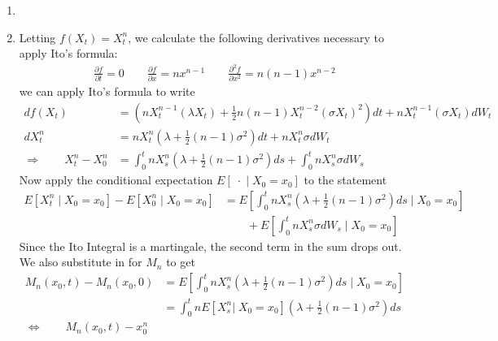 \documentclass[12pt]{article}
\theoremstyle{plain}
\theoremstyle{definition}
\theoremstyle{remark}
\begin{document}
\begin{enumerate}
\begin{enumerate}
      \item %
      \item %
        Letting $f(X_t) = X_t^n$, we calculate the following derivatives
        necessary to apply Ito's formula:
        \begin{align*}
          \frac{\partial f}{\partial t} = 0
          \qquad
          \frac{\partial f}{\partial x} = nx^{n-1}
          \qquad
          \frac{\partial^2 f}{\partial x^2} = n(n-1)x^{n-2}
        \end{align*}
        we can apply Ito's formula to write
        \begin{align*}
          df(X_t)
          &= \left(
            nX_t^{n-1} (\lambda X_t)
            + \frac{1}{2}n(n-1)X_t^{n-2} (\sigma X_t)^2
            \right) dt
            + n X_t^{n-1} (\sigma X_t)dW_t \\
          dX^n_t
          &= nX_t^{n}\left(
            \lambda + \frac{1}{2}(n-1) \sigma^2
            \right) dt
            + n X_t^{n} \sigma dW_t \\
          \Rightarrow\qquad
          X^n_t - X^n_0
          &= \int^t_0 nX_s^{n}\left(
            \lambda + \frac{1}{2}(n-1) \sigma^2
            \right) ds
            + \int^t_0 n X_s^{n} \sigma dW_s
        \end{align*}
        Now apply the conditional expectation $E[\;\cdot\;|\; X_0=x_0]$
        to the statement
        \begin{align*}
          E[X^n_t\;|\;X_0=x_0] - E[X^n_0 \;|\; X_0=x_0]
          &= E\left[ \int^t_0 nX_s^{n}\left(
            \lambda + \frac{1}{2}(n-1) \sigma^2
            \right) ds\;\big| \;X_0=x_0\right]\\
          &\qquad
            + E\left[ \int^t_0 n X_s^{n} \sigma dW_s
                \;\big|\; X_0=x_0\right]
        \end{align*}
        Since the Ito Integral is a martingale, the second term in the
        sum drops out. We also substitute in for $M_n$ to get
        \begin{align*}
          M_n(x_0,t) - M_n(x_0,0)
          &= E\left[ \int^t_0 nX_s^{n}\left(
            \lambda + \frac{1}{2}(n-1) \sigma^2
            \right) ds\;\big| \;X_0=x_0\right]\\
          &= \int^t_0 n
            E\left[X_s^{n}| \;X_0=x_0\right]
            \left(
            \lambda + \frac{1}{2}(n-1) \sigma^2
            \right) ds\\
          \Leftrightarrow \qquad
          M_n(x_0,t) - x_0^n

\end{align*}
\end{enumerate}
\end{enumerate}
\end{document}
